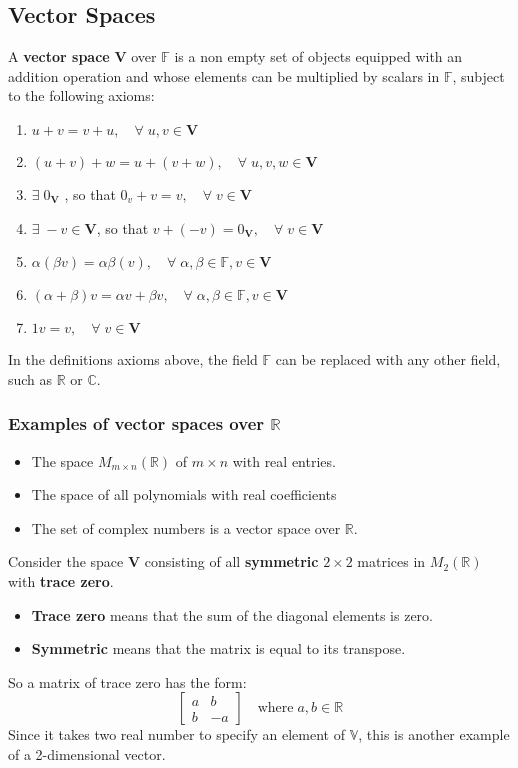\documentclass[a4paper, 9pt]{extarticle}
\begin{document}
\subsection{Vector Spaces}
A \textbf{vector space} $\mathbf{V}$ over $\mathbb{F}$ is a non empty set of objects equipped with an addition operation and whose elements can be multiplied by scalars in $\mathbb{F}$, subject to the following axioms:
\begin{enumerate}
  \item $u+v = v+u, \quad \forall \; u,v \in \mathbf{V} $
  \item $(u+v) +w = u+(v+w), \quad \forall \; u,v,w \in \mathbf{V} $
  \item $\exists \; 0_\mathbf{V}$ , so that $0_v + v = v, \quad \forall \; v \in \mathbf{V} $
  \item $\exists \; -v \in \mathbf{V}$, so that $v + (-v) = 0_\mathbf{V}, \quad \forall \; v \in \mathbf{V} $
  \item $\alpha(\beta v) = \alpha\beta(v), \quad \forall \; \alpha,\beta \in \mathbb{F}, v \in \mathbf{V}$
  \item $(\alpha + \beta)v = \alpha v + \beta v, \quad \forall \; \alpha,\beta \in \mathbb{F}, v \in \mathbf{V}$
  \item $1v = v, \quad \forall \; v \in \mathbf{V}$
\end{enumerate}
In the definitions axioms above, the field $\mathbb{F}$ can be replaced with any other field, such as $\mathbb{R}$ or $\mathbb{C}$.
\subsubsection*{Examples of vector spaces over $\mathbb{R}$}
\begin{itemize}
  \item The space $M_{m \times n}(\mathbb{R})$ of $m \times n$ with real entries.
  \item The space of all polynomials with real coefficients
  \item The set of complex numbers is a vector space over $\mathbb{R}$.
\end{itemize}
Consider the space $\mathbf{V}$ consisting of all \textbf{symmetric} $2 \times 2$ matrices in $M_2(\mathbb{R})$ with \textbf{trace zero}.
\begin{itemize}
  \item \textbf{Trace zero} means that the sum of the diagonal elements is zero.
  \item \textbf{Symmetric} means that the matrix is equal to its transpose.
\end{itemize}
So a matrix of trace zero has the form:
$$
  \begin{bmatrix}
    a & b  \\
    b & -a
  \end{bmatrix}
  \quad \text{where} \; a,b \in \mathbb{R}
$$
Since it takes two real number to specify an element of $\mathbb{V}$, this is another example of a 2-dimensional vector.
\end{document}
